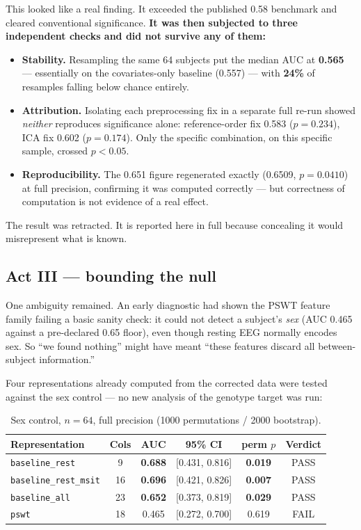 \documentclass[11pt]{article}
\begin{document}
This looked like a real finding. It exceeded the published 0.58 benchmark and
cleared conventional significance. \textbf{It was then subjected to three
independent checks and did not survive any of them:}

\begin{itemize}[leftmargin=1.2cm]
  \item \textbf{Stability.} Resampling the same 64 subjects put the median AUC at
        \textbf{0.565} --- essentially on the covariates-only baseline (0.557) ---
        with \textbf{24\%} of resamples falling below chance entirely.
  \item \textbf{Attribution.} Isolating each preprocessing fix in a separate full
        re-run showed \emph{neither} reproduces significance alone: reference-order
        fix 0.583 ($p = 0.234$), ICA fix 0.602 ($p = 0.174$). Only the specific
        combination, on this specific sample, crossed $p < 0.05$.
  \item \textbf{Reproducibility.} The 0.651 figure regenerated exactly (0.6509,
        $p = 0.0410$) at full precision, confirming it was computed correctly ---
        but correctness of computation is not evidence of a real effect.
\end{itemize}

The result was retracted. It is reported here in full because concealing it would
misrepresent what is known.

\subsection{Act III --- bounding the null}

One ambiguity remained. An early diagnostic had shown the PSWT feature family
failing a basic sanity check: it could not detect a subject's \emph{sex}
(AUC 0.465 against a pre-declared 0.65 floor), even though resting EEG normally
encodes sex. So ``we found nothing'' might have meant ``these features discard
all between-subject information.''

Four representations already computed from the corrected data were tested against
the sex control --- no new analysis of the genotype target was run:

\begin{table}[h]\centering
\caption{Sex control, $n=64$, full precision (1000 permutations / 2000 bootstrap).}
\begin{tabular}{lccccc}
\toprule
Representation & Cols & AUC & 95\% CI & perm $p$ & Verdict \\
\midrule
\texttt{baseline\_rest} & 9 & \textbf{0.688} & [0.431, 0.816] & \textbf{0.019} & PASS \\
\texttt{baseline\_rest\_msit} & 16 & \textbf{0.696} & [0.421, 0.826] & \textbf{0.007} & PASS \\
\texttt{baseline\_all} & 23 & \textbf{0.652} & [0.373, 0.819] & \textbf{0.029} & PASS \\
\texttt{pswt} & 18 & 0.465 & [0.272, 0.700] & 0.619 & FAIL \\
\bottomrule
\end{tabular}
\end{table}
\end{document}
